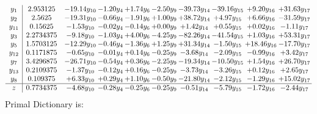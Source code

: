 \documentclass[9pt]{article}
\begin{document}
\[\begin{array}{c| c c@{\hskip 2pt} c@{\hskip 2pt} c@{\hskip 2pt} c@{\hskip 2pt} c@{\hskip 2pt} c@{\hskip 2pt} c@{\hskip 2pt} c@{\hskip 2pt} }
 y_{1}   &  2.953125 & -19.14 y_{10} & -1.20 y_{4} & +  1.74 y_{6} & -2.50 y_{9} & -39.73 y_{14} & -39.16 y_{15} & +  9.20 y_{16} & + 31.63 y_{17}\\
 y_{2}   &  2.5625 & -19.31 y_{10} & -0.66 y_{4} & -1.91 y_{6} & +  1.00 y_{9} & + 38.72 y_{14} & +  4.97 y_{15} & +  6.66 y_{16} & -31.59 y_{17}\\
 y_{11}   &  0.15625 & -1.53 y_{10} & -0.02 y_{4} & -0.14 y_{6} & +  0.00 y_{9} & +  1.42 y_{14} & +  0.55 y_{15} & +  0.02 y_{16} & -1.11 y_{17}\\
 y_{3}   &  2.2734375 & -9.18 y_{10} & -1.03 y_{4} & +  4.00 y_{6} & -4.25 y_{9} & -82.26 y_{14} & -41.54 y_{15} & +  1.03 y_{16} & + 53.31 y_{17}\\
 y_{5}   &  1.5703125 & -12.29 y_{10} & -0.46 y_{4} & -1.36 y_{6} & +  1.25 y_{9} & + 31.34 y_{14} & -1.50 y_{15} & + 18.46 y_{16} & -17.70 y_{17}\\
 y_{12}   &  0.1171875 & -0.65 y_{10} & -0.01 y_{4} & +  0.14 y_{6} & -0.25 y_{9} & -3.68 y_{14} & -2.09 y_{15} & -0.99 y_{16} & +  3.42 y_{17}\\
 y_{7}   &  3.4296875 & -26.71 y_{10} & -0.54 y_{4} & +  0.36 y_{6} & -2.25 y_{9} & -19.34 y_{14} & -10.50 y_{15} & +  1.54 y_{16} & + 26.70 y_{17}\\
 y_{13}   &  0.2109375 & -1.37 y_{10} & -0.12 y_{4} & +  0.16 y_{6} & -0.25 y_{9} & -3.73 y_{14} & -3.26 y_{15} & +  0.12 y_{16} & +  2.65 y_{17}\\
 y_{8}   &  0.109375 & +  6.33 y_{10} & +  0.29 y_{4} & +  1.10 y_{6} & -0.50 y_{9} & -21.80 y_{14} & -2.12 y_{15} & -1.29 y_{16} & + 15.02 y_{17}\\
\hline
z    &  0.7734375 & -4.68 y_{10} & -0.28 y_{4} & -0.25 y_{6} & -0.25 y_{9} & -0.51 y_{14} & -5.79 y_{15} & -1.72 y_{16} & -2.44 y_{17}\\
\end{array}\]
Primal Dictionary is:
\end{document}

